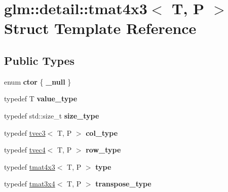 \hypertarget{structglm_1_1detail_1_1tmat4x3}{}\section{glm\+:\+:detail\+:\+:tmat4x3$<$ T, P $>$ Struct Template Reference}
\label{structglm_1_1detail_1_1tmat4x3}
\subsection*{Public Types}
\begin{DoxyCompactItemize}
\item 
enum {\bfseries ctor} \{ {\bfseries \+\_\+null}
 \}\hypertarget{structglm_1_1detail_1_1tmat4x3_ac17f13b8e4946fda04e2c86b280491fe}{}\label{structglm_1_1detail_1_1tmat4x3_ac17f13b8e4946fda04e2c86b280491fe}

\item 
typedef T {\bfseries value\+\_\+type}\hypertarget{structglm_1_1detail_1_1tmat4x3_a059eb027e7aebee491c0edcf17235557}{}\label{structglm_1_1detail_1_1tmat4x3_a059eb027e7aebee491c0edcf17235557}

\item 
typedef std\+::size\+\_\+t {\bfseries size\+\_\+type}\hypertarget{structglm_1_1detail_1_1tmat4x3_aceab433265627d5787fe291463d19b91}{}\label{structglm_1_1detail_1_1tmat4x3_aceab433265627d5787fe291463d19b91}

\item 
typedef \hyperlink{structglm_1_1detail_1_1tvec3}{tvec3}$<$ T, P $>$ {\bfseries col\+\_\+type}\hypertarget{structglm_1_1detail_1_1tmat4x3_a58afd510f7ab968e5a86e20f2f3979de}{}\label{structglm_1_1detail_1_1tmat4x3_a58afd510f7ab968e5a86e20f2f3979de}

\item 
typedef \hyperlink{structglm_1_1detail_1_1tvec4}{tvec4}$<$ T, P $>$ {\bfseries row\+\_\+type}\hypertarget{structglm_1_1detail_1_1tmat4x3_a4c401c9b82fb80f9646813f0d9c1c70e}{}\label{structglm_1_1detail_1_1tmat4x3_a4c401c9b82fb80f9646813f0d9c1c70e}

\item 
typedef \hyperlink{structglm_1_1detail_1_1tmat4x3}{tmat4x3}$<$ T, P $>$ {\bfseries type}\hypertarget{structglm_1_1detail_1_1tmat4x3_aee33430c6a618f2452a740cd4a509a03}{}\label{structglm_1_1detail_1_1tmat4x3_aee33430c6a618f2452a740cd4a509a03}

\item 
typedef \hyperlink{structglm_1_1detail_1_1tmat3x4}{tmat3x4}$<$ T, P $>$ {\bfseries transpose\+\_\+type}\hypertarget{structglm_1_1detail_1_1tmat4x3_a80f4669c67e4c9fb3e9f44d3dcf439d2}{}\label{structglm_1_1detail_1_1tmat4x3_a80f4669c67e4c9fb3e9f44d3dcf439d2}

\end{DoxyCompactItemize}
